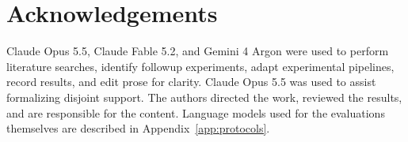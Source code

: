 \documentclass[11pt]{article}
\begin{document}
\section*{Acknowledgements}
Claude Opus 5.5, Claude Fable 5.2, and Gemini 4 Argon were used to perform literature 
searches, identify followup experiments, adapt experimental pipelines,
record results, and edit prose for clarity.
Claude Opus 5.5 was used to assist formalizing disjoint support.
The authors directed the work, reviewed the results, and are responsible for the content.
Language models used for the evaluations themselves are described in Appendix~\ref{app:protocols}.

\printbibliography

\wugaru{24pt}


\end{document}
